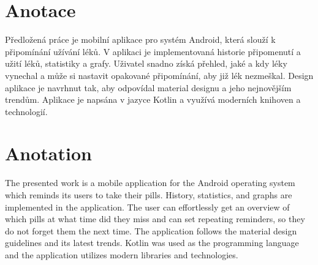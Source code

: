 \documentclass[../TakeYourPill.tex]{subfiles}
\begin{document}
\newpage
\section*{Anotace}
Předložená práce je mobilní aplikace pro systém Android, která slouží k připomínání užívání léků. V aplikaci je implementovaná historie připomenutí a užití léků, statistiky a grafy. Uživatel snadno získá přehled, jaké a kdy léky vynechal a může si nastavit opakované připomínání, aby již lék nezmeškal. Design aplikace je navrhnut tak, aby odpovídal material designu a jeho nejnovějším trendům. Aplikace je napsána v jazyce Kotlin a využívá moderních knihoven a technologií.
\vspace*{\fill}
\section*{Anotation}
The presented work is a mobile application for the Android operating system which reminds its users to take their pills. History, statistics, and graphs are implemented in the application. The user can effortlessly get an overview of which pills at what time did they miss and can set repeating reminders, so they do not forget them the next time. The application follows the material design guidelines and its latest trends. Kotlin was used as the programming language and the application utilizes modern libraries and technologies.
\end{document}
